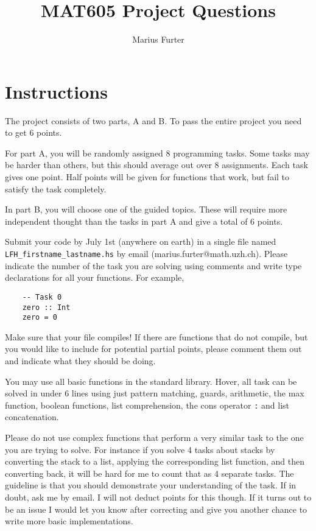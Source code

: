 \documentclass{article}[12pt]
\title{MAT605 Project Questions}
\author{Marius Furter}
\theoremstyle{definition}
\begin{document}
\maketitle

\tableofcontents

\section{Instructions}
The project consists of two parts, A and B. To pass the entire project you need to get 6 points.

For part A, you will be randomly assigned 8 programming tasks. Some tasks may be harder than others, but this should average out over 8 assignments. Each task gives one point. Half points will be given for functions that work, but fail to satisfy the task completely.

In part B, you will choose one of the guided topics. These will require more independent thought than the tasks in part A and give a total of 6 points. 

Submit your code by July 1st (anywhere on earth) in a single file named \verb|LFH_firstname_lastname.hs| by email (marius.furter@math.uzh.ch). Please indicate the number of the task you are solving using comments and write type declarations for all your functions. For example,
\begin{verbatim}
    -- Task 0
    zero :: Int
    zero = 0
\end{verbatim}
Make sure that your file compiles! If there are functions that do not compile, but you would like to include for potential partial points, please comment them out and indicate what they should be doing.

You may use all basic functions in the standard library. Hover, all task can be solved in under 6 lines using just pattern matching, guards, arithmetic, the max function, boolean functions, list comprehension, the cons operator \verb|:| and list concatenation. 

Please do not use complex functions that perform a very similar task to the one you are trying to solve. For instance if you solve 4 tasks about stacks by converting the stack to a list, applying the corresponding list function, and then converting back, it will be hard for me to count that as 4 separate tasks. The guideline is that you should demonstrate your understanding of the task. If in doubt, ask me by email. I will not deduct points for this though. If it turns out to be an issue I would let you know after correcting and give you another chance to write more basic implementations.
\end{document}
